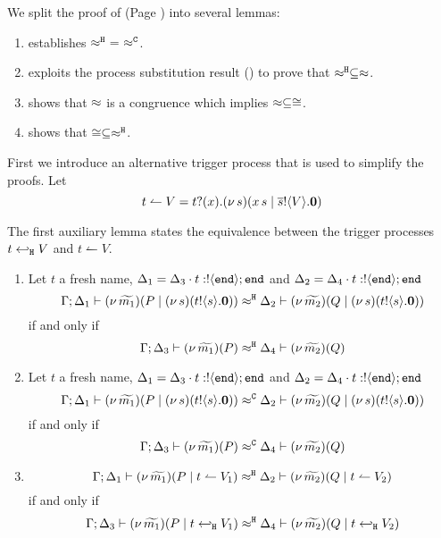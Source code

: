 \noi We split the proof of  (Page \pageref{the:coincidence}) into 
several lemmas:
\begin{enumerate}[$-$]
\item	{} establishes $\hwb\ =\ \fwb$.
\item	{} exploits the process substitution result
		() to prove that $\approx^\mathtt{H} \subseteq \approx$.
\item	{} shows that $\approx$ is a congruence
		which implies $\approx \subseteq \cong$.
\item	{} shows  that $\cong \subseteq \approx^\mathtt{H}$.
\end{enumerate}

\newcommand{\ntrigger}[2]{#1 \leftharpoonup #2}
\newcommand{\newtrigger}[2]{\binp{#1}{x} \newsp{s}{\appl{x}{s} \Par \bout{\dual{s}}{#2} \inact} }

First we introduce an alternative trigger process
that is used to simplify the proofs. Let
\[
	\ntrigger{t}{V} = \newtrigger{t}{V}
\]

The first auxiliary lemma states the equivalence between
the trigger processes $t \hookleftarrow_{\mathtt{H}} V$ and $\ntrigger{t}{V}$.
\begin{lemma}
	\label{lem:alt_tr}
	\begin{enumerate}
		\item	Let $t$ a fresh name, $\Delta_1 = \Delta_3 \cdot t: ! \langle \mathtt{end} \rangle ; \mathtt{end}$ and
				$\Delta_2 = \Delta_4 \cdot t: ! \langle \mathtt{end} \rangle ; \mathtt{end}$
				\[
					\Gamma; \Delta_1 \vdash (\nu\, \widetilde{m_1})(P \;|\; (\nu\, s)(t ! \langle s \rangle . \mathbf{0})  )  \approx^\mathtt{H} \Delta_2 \vdash (\nu\, \widetilde{m_2})(Q \;|\; (\nu\, s)(t ! \langle s \rangle . \mathbf{0})  )
				\]
				if and only if
				\[
					\Gamma; \Delta_3 \vdash (\nu\, \widetilde{m_1})(P  )  \approx^\mathtt{H} \Delta_4 \vdash (\nu\, \widetilde{m_2})(Q)
				\]

		\item	Let $t$ a fresh name, $\Delta_1 = \Delta_3 \cdot t: ! \langle \mathtt{end} \rangle ; \mathtt{end}$ and
				$\Delta_2 = \Delta_4 \cdot t: ! \langle \mathtt{end} \rangle ; \mathtt{end}$
				\[
					\Gamma; \Delta_1 \vdash (\nu\, \widetilde{m_1})(P \;|\; (\nu\, s)(t ! \langle s \rangle . \mathbf{0})  )  \approx^\mathtt{C} \Delta_2 \vdash (\nu\, \widetilde{m_2})(Q \;|\; (\nu\, s)(t ! \langle s \rangle . \mathbf{0})  )
				\]
				if and only if
				\[
					\Gamma; \Delta_3 \vdash (\nu\, \widetilde{m_1})(P  )  \approx^\mathtt{C} \Delta_4 \vdash (\nu\, \widetilde{m_2})(Q)
				\]

		\item
				\[
					\horel{\Gamma}{\Delta_1}{\newsp{\widetilde{m_1}}{P \Par \ntrigger{t}{V_1}  } }
					{\hwb}
					{\Delta_2}{\newsp{\widetilde{m_2}}{Q \Par \ntrigger{t}{V_2}  } }
				\]
				if and only if
				\[
					\Gamma; \Delta_3 \vdash (\nu\, \widetilde{m_1})(P \;|\; t \hookleftarrow_{\mathtt{H}} V_1  )  \approx^\mathtt{H} \Delta_4 \vdash (\nu\, \widetilde{m_2})(Q \;|\; t \hookleftarrow_{\mathtt{H}} V_2)
				\]
	\end{enumerate}
\end{lemma}

